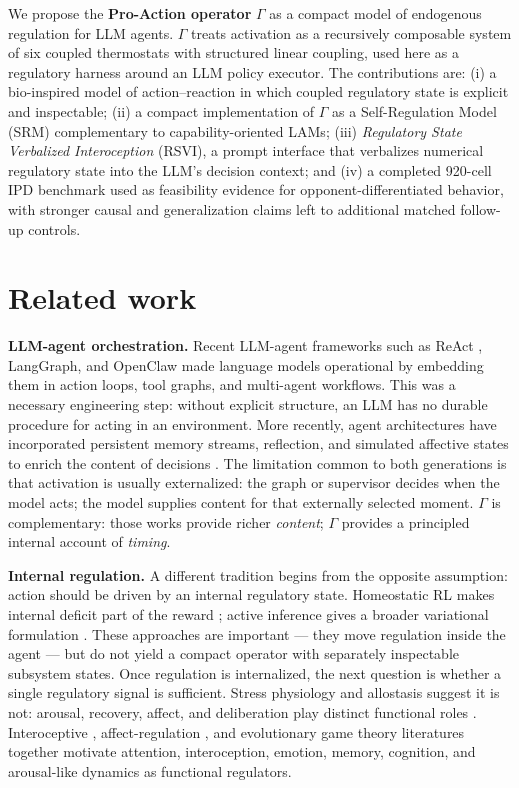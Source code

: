 \documentclass{article}
\begin{document}
We propose the \textbf{Pro-Action operator} $\Gamma$ as a compact model of endogenous regulation for LLM agents. $\Gamma$ treats activation as a recursively composable system of six coupled thermostats with structured linear coupling, used here as a regulatory harness around an LLM policy executor. The contributions are: (i) a bio-inspired model of action--reaction in which coupled regulatory state is explicit and inspectable; (ii) a compact implementation of $\Gamma$ as a Self-Regulation Model (SRM) complementary to capability-oriented LAMs; (iii) \textit{Regulatory State Verbalized Interoception} (RSVI), a prompt interface that verbalizes numerical regulatory state into the LLM's decision context; and (iv) a completed 920-cell IPD benchmark used as feasibility evidence for opponent-differentiated behavior, with stronger causal and generalization claims left to additional matched follow-up controls.

\section{Related work}\label{sec:related}

\textbf{LLM-agent orchestration.} Recent LLM-agent frameworks such as ReAct \citep{yao2023react}, LangGraph, and OpenClaw made language models operational by embedding them in action loops, tool graphs, and multi-agent workflows. This was a necessary engineering step: without explicit structure, an LLM has no durable procedure for acting in an environment. More recently, agent architectures have incorporated persistent memory streams, reflection, and simulated affective states to enrich the content of decisions \citep{park2023generative,kaiya2023lyfe,wang2023emotional,wang2023voyager}. The limitation common to both generations is that activation is usually externalized: the graph or supervisor decides when the model acts; the model supplies content for that externally selected moment. $\Gamma$ is complementary: those works provide richer \textit{content}; $\Gamma$ provides a principled internal account of \textit{timing}.

\textbf{Internal regulation.} A different tradition begins from the opposite assumption: action should be driven by an internal regulatory state. Homeostatic RL makes internal deficit part of the reward \citep{keramati2014homeostatic}; active inference gives a broader variational formulation \citep{friston2017active,parr2022active}. These approaches are important --- they move regulation inside the agent --- but do not yield a compact operator with separately inspectable subsystem states. Once regulation is internalized, the next question is whether a single regulatory signal is sufficient. Stress physiology and allostasis suggest it is not: arousal, recovery, affect, and deliberation play distinct functional roles \citep{sterling1988allostasis,kirschbaum1993cortisol,mcewen2007physiology}. Interoceptive \citep{damasio1994descartes,craig2009you}, affect-regulation \citep{ledoux2012rethinking,barrett2017how}, and evolutionary game theory \citep{henrich2005foundations,nowak2006evolutionary} literatures together motivate attention, interoception, emotion, memory, cognition, and arousal-like dynamics as functional regulators.
\end{document}
